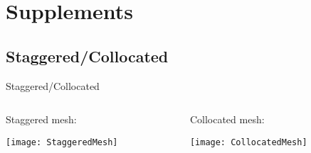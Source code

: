     
    
    \section{Supplements}
    
    
    \subsection*{Staggered/Collocated}
    \begin{frame}[c,label=Meshes]{Staggered/Collocated}
        \begin{columns}
            \begin{column}[T]{0.4\textwidth}
                Staggered mesh:                
               \begin{center}
                   \texttt{[image: StaggeredMesh]}
               \end{center}
            \end{column}
            \hfill
            \begin{column}[T]{0.4\textwidth}
                Collocated mesh:
                \begin{center}
                    \texttt{[image: CollocatedMesh]}
                \end{center}
            \end{column}
        \end{columns}
    \end{frame}
    
    

